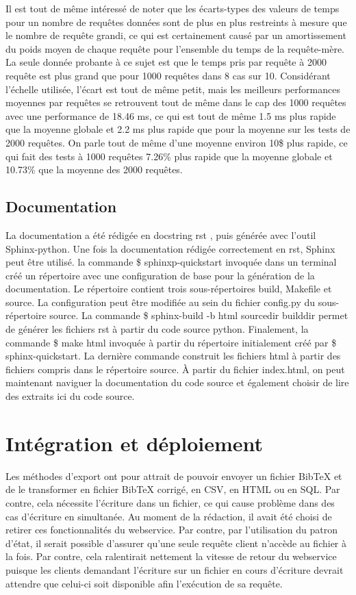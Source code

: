 \documentclass[12pt,titlepage]{article}
\let\oldsection\section
\renewcommand\section{\clearpage\oldsection}
\begin{document}
Il est tout de même intéressé de noter que les écarts-types des valeurs de temps pour un nombre de requêtes données sont de plus en plus restreints à mesure que le nombre de requête grandi, ce qui est certainement causé par un amortissement du poids moyen de chaque requête pour l'ensemble du temps de la requête-mère. La seule donnée probante à ce sujet est que le temps pris par requête à 2000 requête est plus grand que pour 1000 requêtes dans 8 cas sur 10. Considérant l'échelle utilisée, l'écart est tout de même petit, mais les meilleurs performances moyennes par requêtes se retrouvent tout de même dans le cap des 1000 requêtes avec une performance de 18.46 ms, ce qui est tout de même 1.5 ms plus rapide que la moyenne globale et 2.2 ms plus rapide que pour la moyenne sur les tests de 2000 requêtes. On parle tout de même d'une moyenne environ 10\$ plus rapide, ce qui fait des tests à 1000 requêtes 7.26\% plus rapide que la moyenne globale et 10.73\% que la moyenne des 2000 requêtes.

\subsection{Documentation}
La documentation a été rédigée en docstring rst \cite{PDGa}, puis générée avec l'outil Sphinx-python. Une fois la documentation rédigée correctement en rst, Sphinx peut être utilisé. la commande \$ sphinxp-quickstart invoquée dans un terminal créé un répertoire avec une configuration de base pour la génération de la documentation. Le répertoire contient trois sous-répertoires build, Makefile et source. La configuration peut être modifiée au sein du fichier config.py du sous-répertoire source. La commande \$ sphinx-build -b html sourcedir builddir permet de générer les fichiers rst à partir du code source python. Finalement, la commande \$ make html invoquée à partir du répertoire initialement créé par \$ sphinx-quickstart. La dernière commande construit les fichiers html à partir des fichiers compris dans le répertoire source. À partir du fichier index.html, on peut maintenant naviguer la documentation du code source et également choisir de lire des extraits ici du code source. 

\section{Intégration et déploiement}


Les méthodes d'export ont pour attrait de pouvoir envoyer un fichier BibTeX et de le transformer en fichier BibTeX corrigé, en CSV, en HTML ou en SQL. Par contre, cela nécessite l'écriture dans un fichier, ce qui cause problème dans des cas d'écriture en simultanée. Au moment de la rédaction, il avait été choisi de retirer ces fonctionnalités du webservice. Par contre, par l'utilisation du patron d'état, il serait possible d'assurer qu'une seule requête client n'accède au fichier à la fois. Par contre, cela ralentirait nettement la vitesse de retour du webservice puisque les clients demandant l'écriture sur un fichier en cours d'écriture devrait attendre que celui-ci soit disponible afin l'exécution de sa requête.\newline
\end{document}

